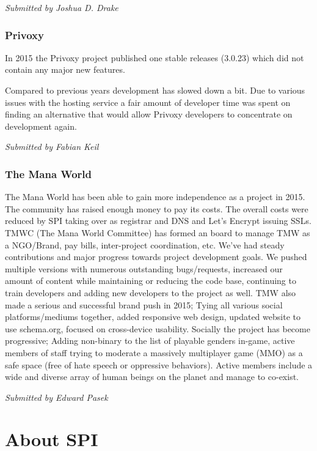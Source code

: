 \documentclass[letterpaper]{report}
\begin{document}
{\em Submitted by Joshua D. Drake}

\subsection{Privoxy}

In 2015 the Privoxy project published one stable releases (3.0.23) which
did not contain any major new features.

Compared to previous years development has slowed down a bit.  Due to
various issues with the hosting service a fair amount of developer time
was spent on finding an alternative that would allow Privoxy developers to
concentrate on development again.

{\em Submitted by Fabian Keil}

\subsection{The Mana World}

The Mana World has been able to gain more independence as a project in
2015. The community has raised enough money to pay its costs. The overall
costs were reduced by SPI taking over as registrar and DNS and Let's
Encrypt issuing SSLs. TMWC (The Mana World Committee) has formed an board
to manage TMW as a NGO/Brand, pay bills, inter-project coordination, etc.
We've had steady contributions and major progress towards project
development goals. We pushed multiple versions with numerous outstanding
bugs/requests, increased our amount of content while maintaining or
reducing the code base, continuing to train developers and adding new
developers to the project as well. TMW also made a serious and successful
brand push in 2015; Tying all various social platforms/mediums together,
added responsive web design, updated website to use schema.org, focused on
cross-device usability. Socially the project has become progressive; Adding
non-binary to the list of playable genders in-game, active members of staff
trying to moderate a massively multiplayer game (MMO) as a safe space (free
of hate speech or oppressive behaviors). Active members include a wide and
diverse array of human beings on the planet and manage to co-exist.

{\em Submitted by Edward Pasek}


\appendix
\chapter{About SPI}
\end{document}
